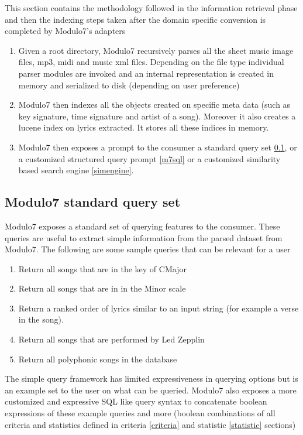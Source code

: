 \noindent This section contains the methodology followed in the information retrieval phase and then the indexing steps taken after the domain specific conversion is completed by Modulo7's adapters

\begin{enumerate}
\item Given a root directory, Modulo7 recursively parses all the sheet music image files, mp3, midi and music xml files. Depending on the file type individual parser modules are invoked and an internal representation is created in memory and serialized to disk (depending on user preference)
\item Modulo7 then indexes all the objects created on specific meta data (such as key signature, time signature and artist of a song). Moreover it also creates a lucene index on lyrics extracted. It stores all these indices in memory. 
\item Modulo7 then exposes a prompt to the consumer a standard query set \ref{standardquery}, or a customized structured query prompt \ref{m7sql} or a customized similarity based search engine \ref{simengine}. 
\end{enumerate}

\subsection{Modulo7 standard query set} \label{standardquery}

\noindent Modulo7 exposes a standard set of querying features to the consumer. These queries are useful to extract simple information from the parsed dataset from Modulo7. The following are some sample queries that can be relevant for a user

\begin{enumerate}
\item Return all songs that are in the key of CMajor
\item Return all songs that are in in the Minor scale
\item Return a ranked order of lyrics similar to an input string (for example a verse in the song). 
\item Return all songs that are performed by Led Zepplin
\item Return all polyphonic songs in the database
\end{enumerate}

\noindent The simple query framework has limited expressiveness in querying options but is an example set to the user on what can be queried. Modulo7 also exposes a more customized and expressive SQL like query syntax to concatenate boolean expressions of these example queries and more (boolean combinations of all criteria and statistics defined in criteria \ref{criteria} and statistic \ref{statistic} sections)

